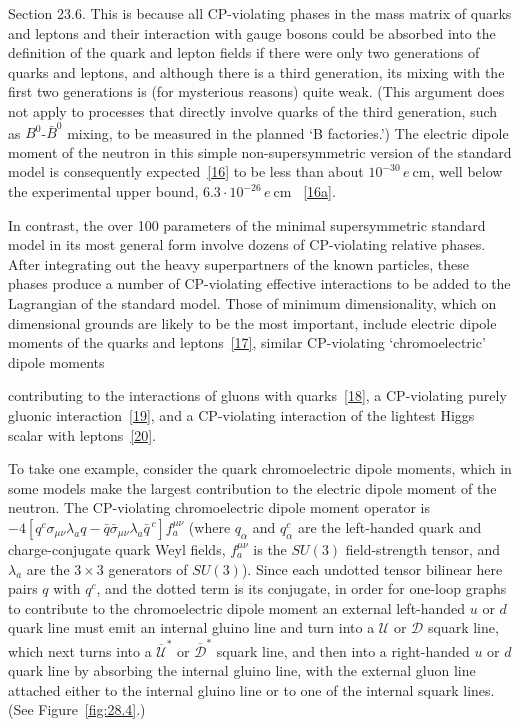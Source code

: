 \noindent
Section 23.6. This is because all CP-violating phases in the mass matrix
of quarks and leptons and their interaction with gauge bosons could be
absorbed into the definition of the quark and lepton fields if there were
only two generations of quarks and leptons, and although there is a third
generation, its mixing with the first two generations is (for mysterious
reasons) quite weak. (This argument does not apply to processes that
directly involve quarks of the third generation, such as
\(B^0\)-\(\bar B^0\) mixing, to be measured in the planned `B
factories.') The electric dipole moment of the neutron in this simple
non-supersymmetric version of the standard model is consequently
expected~\hyperref[ch28-ref-16]{[16]} to be less than about
\(10^{-30}\,e\ \mathrm{cm}\), well below the experimental upper bound,
\(6.3\mathbin{\cdot}10^{-26}\,e\ \mathrm{cm}\)
~\hyperref[ch28-ref-16a]{[16a]}.

In contrast, the over 100 parameters of the minimal supersymmetric
standard model in its most general form involve dozens of CP-violating
relative phases. After integrating out the heavy superpartners of the
known particles, these phases produce a number of CP-violating effective
interactions to be added to the Lagrangian of the standard model. Those of
minimum dimensionality, which on dimensional grounds are likely to be the
most important, include electric dipole moments of the quarks and
leptons~\hyperref[ch28-ref-17]{[17]}, similar CP-violating
`chromoelectric' dipole moments


\noindent
contributing to the interactions of gluons with
quarks~\hyperref[ch28-ref-18]{[18]}, a CP-violating purely gluonic
interaction~\hyperref[ch28-ref-19]{[19]}, and a CP-violating interaction
of the lightest Higgs scalar with leptons~\hyperref[ch28-ref-20]{[20]}.

To take one example, consider the quark chromoelectric dipole moments,
which in some models make the largest contribution to the electric dipole
moment of the neutron. The CP-violating chromoelectric dipole moment
operator is
\(-4\left[
    q^c\sigma_{\mu\nu}\lambda_aq
    -\bar q\bar\sigma_{\mu\nu}\lambda_a\bar q^{\,c}
  \right]f_a^{\mu\nu}\)
(where \(q_\alpha\) and \(q^c_\alpha\) are the left-handed quark and
charge-conjugate quark Weyl fields,
\(f_a^{\mu\nu}\) is the \(SU(3)\) field-strength tensor, and
\(\lambda_a\) are the \(3\mathbin{\times}3\) generators of \(SU(3)\)).
Since each undotted tensor bilinear here pairs \(q\) with \(q^c\), and the
dotted term is its conjugate, in
order for one-loop graphs to contribute to the chromoelectric dipole
moment an external left-handed \(u\) or \(d\) quark line must emit an
internal gluino line and turn into a \(\mathcal{U}\) or \(\mathcal{D}\)
squark line, which next turns into a
\(\overline{\mathcal{U}}^*\) or \(\overline{\mathcal{D}}^*\) squark
line, and then into a right-handed \(u\) or \(d\) quark line by absorbing
the internal gluino line, with the external gluon line attached either to
the internal gluino line or to one of the internal squark lines. (See
Figure~\ref{fig:28.4}.)

